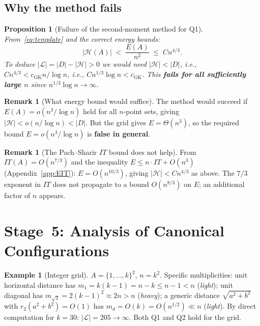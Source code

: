 \documentclass[12pt,a4paper]{amsart}
\theoremstyle{plain}
\newtheorem{proposition}[theorem]{Proposition}
\theoremstyle{definition}
\newtheorem{example}[theorem]{Example}
\newtheorem{remark}[theorem]{Remark}
\newcommand{\abs}[1]{\left\lvert #1 \right\rvert}
\newcommand{\cL}{\mathcal{L}}
\newcommand{\cH}{\mathcal{H}}
\begin{document}
\subsection{Why the method fails}

\begin{proposition}[Failure of the second-moment method for Q1]
\label{prop:failure}
From~\eqref{eq:template} and the correct energy bounds:
\[
  \abs{\cH(A)} \;<\; \frac{E(A)}{n^2} \;\le\; Cn^{4/3}.
\]
To deduce $\abs{\cL} = \abs{D} - \abs{\cH} > 0$ we would need
$\abs{\cH} < \abs{D}$, i.e., $Cn^{4/3} < c_{\mathrm{GK}} n/\log n$,
i.e., $C n^{1/3} \log n < c_{\mathrm{GK}}$.
This \textbf{fails for all sufficiently large $n$} since
$n^{1/3} \log n \to \infty$.
\end{proposition}

\begin{remark}[What energy bound would suffice]
The method would succeed if $E(A) = o(n^3/\log n)$ held for all
$n$-point sets, giving $\abs{\cH} < o(n/\log n) < \abs{D}$.
But the grid gives $E = \Theta(n^3)$, so the required bound
$E = o(n^3/\log n)$ is \textbf{false in general}.
\end{remark}

\begin{remark}[The Pach--Sharir $IT$ bound does not help]
From $IT(A) = O(n^{7/3})$ and the inequality $E \le n \cdot IT +
O(n^3)$ (Appendix~\ref{app:EIT}): $E = O(n^{10/3})$, giving
$\abs{\cH} < Cn^{4/3}$ as above.  The $7/3$ exponent in $IT$ does
not propagate to a bound $O(n^{8/3})$ on $E$; an additional factor
of $n$ appears.
\end{remark}

\section{Stage~5: Analysis of Canonical Configurations}
\label{sec:configs}

\begin{example}[Integer grid]
\label{ex:grid}
$A = \{1,\ldots,k\}^2$, $n = k^2$.
Specific multiplicities: unit horizontal distance has
$m_1 = k(k-1) = n-k \le n-1 < n$ (\emph{light});
unit diagonal has $m_{\sqrt{2}} = 2(k-1)^2 \approx 2n > n$ (\emph{heavy});
a generic distance $\sqrt{a^2+b^2}$ with $r_2(a^2+b^2) = O(1)$
has $m_d = O(k) = O(n^{1/2}) \ll n$ (\emph{light}).
By direct computation for $k = 30$: $\abs{\cL} = 205 \to \infty$.
Both Q1 and Q2 hold for the grid.
\end{example}
\end{document}
